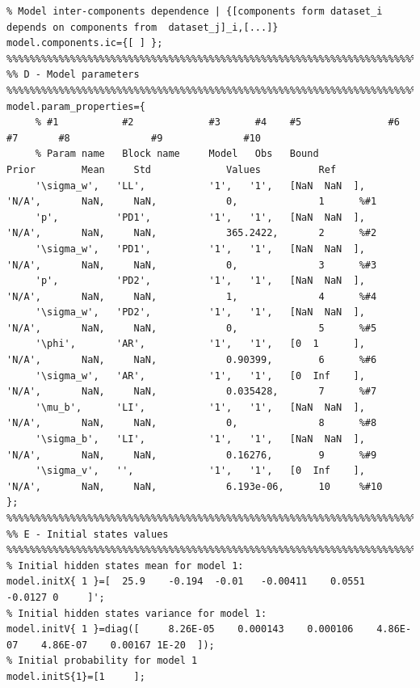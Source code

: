 \begin{lstlisting}
% Model inter-components dependence | {[components form dataset_i depends on components from  dataset_j]_i,[...]}
model.components.ic={[ ] };
%%%%%%%%%%%%%%%%%%%%%%%%%%%%%%%%%%%%%%%%%%%%%%%%%%%%%%%%%%%%%%%%%%%%%%%%%%%
%% D - Model parameters 
%%%%%%%%%%%%%%%%%%%%%%%%%%%%%%%%%%%%%%%%%%%%%%%%%%%%%%%%%%%%%%%%%%%%%%%%%%%
model.param_properties={
     % #1           #2             #3      #4    #5               #6           #7       #8              #9              #10
     % Param name   Block name     Model   Obs   Bound            Prior        Mean     Std             Values          Ref
     '\sigma_w',   'LL',           '1',   '1',   [NaN  NaN  ],    'N/A',       NaN,     NaN,            0,              1      %#1   
     'p',          'PD1',          '1',   '1',   [NaN  NaN  ],    'N/A',       NaN,     NaN,            365.2422,       2      %#2   
     '\sigma_w',   'PD1',          '1',   '1',   [NaN  NaN  ],    'N/A',       NaN,     NaN,            0,              3      %#3   
     'p',          'PD2',          '1',   '1',   [NaN  NaN  ],    'N/A',       NaN,     NaN,            1,              4      %#4   
     '\sigma_w',   'PD2',          '1',   '1',   [NaN  NaN  ],    'N/A',       NaN,     NaN,            0,              5      %#5   
     '\phi',       'AR',           '1',   '1',   [0  1      ],    'N/A',       NaN,     NaN,            0.90399,        6      %#6   
     '\sigma_w',   'AR',           '1',   '1',   [0  Inf    ],    'N/A',       NaN,     NaN,            0.035428,       7      %#7   
     '\mu_b',      'LI',           '1',   '1',   [NaN  NaN  ],    'N/A',       NaN,     NaN,            0,              8      %#8   
     '\sigma_b',   'LI',           '1',   '1',   [NaN  NaN  ],    'N/A',       NaN,     NaN,            0.16276,        9      %#9   
     '\sigma_v',   '',             '1',   '1',   [0  Inf    ],    'N/A',       NaN,     NaN,            6.193e-06,      10     %#10  
};
%%%%%%%%%%%%%%%%%%%%%%%%%%%%%%%%%%%%%%%%%%%%%%%%%%%%%%%%%%%%%%%%%%%%%%%%%%%
%% E - Initial states values 
%%%%%%%%%%%%%%%%%%%%%%%%%%%%%%%%%%%%%%%%%%%%%%%%%%%%%%%%%%%%%%%%%%%%%%%%%%%
% Initial hidden states mean for model 1:
model.initX{ 1 }=[	25.9  	-0.194	-0.01 	-0.00411	0.0551	-0.0127	0     ]';
% Initial hidden states variance for model 1: 
model.initV{ 1 }=diag([ 	8.26E-05	0.000143	0.000106	4.86E-07	4.86E-07	0.00167	1E-20  ]);
% Initial probability for model 1
model.initS{1}=[1     ];

\end{lstlisting}

